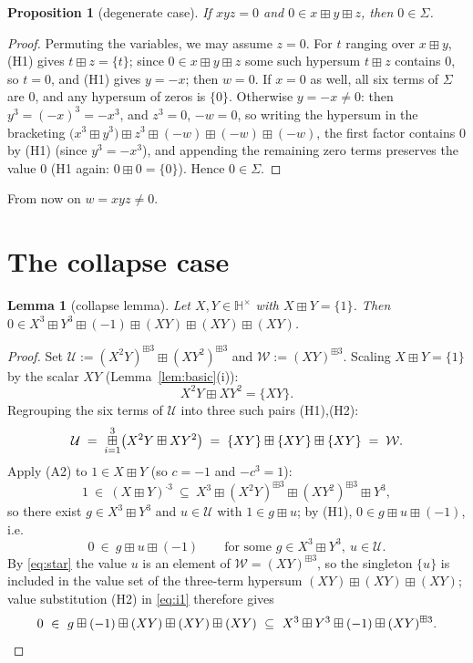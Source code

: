 \documentclass[11pt]{article}
\newtheorem{lemma}[theorem]{Lemma}
\newtheorem{proposition}[theorem]{Proposition}
\theoremstyle{definition}
\theoremstyle{remark}
\newcommand{\Hb}{\mathbb{H}}
\newcommand{\bp}{\boxplus}
\newcommand{\bigboxplus}{\mathop{\mbox{\normalsize$\boxplus$}}\limits}
\begin{document}
\begin{proposition}[degenerate case]\label{prop:degen}
If $xyz=0$ and $0\in x\bp y\bp z$, then $0\in\Sigma$.
\end{proposition}
\begin{proof}
Permuting the variables, we may assume $z=0$. For $t$ ranging over
$x\bp y$, (H1) gives $t\bp z=\{t\}$; since $0\in x\bp y\bp z$ some such
hypersum $t\bp z$ contains $0$, so $t=0$, and (H1) gives $y=-x$; then
$w=0$. If $x=0$ as well, all six terms of $\Sigma$ are $0$, and any
hypersum of zeros is $\{0\}$. Otherwise $y=-x\neq0$: then
$y^3=(-x)^3=-x^3$, and $z^3=0$, $-w=0$, so writing the hypersum in the
bracketing $\bigl(x^3\bp y^3\bigr)\bp z^3\bp(-w)\bp(-w)\bp(-w)$, the
first factor contains $0$ by (H1) (since $y^3=-x^3$), and appending the
remaining zero terms preserves the value $0$ (H1 again:
$0\bp0=\{0\}$). Hence $0\in\Sigma$.
\end{proof}

From now on $w=xyz\neq0$.

\section{The collapse case}\label{sec:collapse}

\begin{lemma}[collapse lemma]\label{lem:collapse}
Let $X,Y\in\Hb^\times$ with $X\bp Y=\{1\}$. Then
$0\in X^3\bp Y^3\bp(-1)\bp(XY)\bp(XY)\bp(XY)$.
\end{lemma}

\begin{proof}
Set $\mathcal U:=(X^2Y)^{\bp3}\bp(XY^2)^{\bp3}$ and
$\mathcal W:=(XY)^{\bp3}$. Scaling $X\bp Y=\{1\}$ by the scalar $XY$
(Lemma~\ref{lem:basic}(i)):
\[
  X^2Y\bp XY^2=\{XY\}.
\]
Regrouping the six terms of $\mathcal U$ into three such pairs (H1),(H2):
\begin{equation}\label{eq:star}
  \mathcal U
  \;=\;\bigboxplus_{i=1}^{3}\bigl(X^2Y\bp XY^2\bigr)
  \;=\;\{XY\}\bp\{XY\}\bp\{XY\}
  \;=\;\mathcal W .
\end{equation}
Apply (A2) to $1\in X\bp Y$ (so $c=-1$ and $-c^3=1$):
\[
  1\ \in\ (X\bp Y)^{\cdot3}\ \subseteq\
   X^3\bp(X^2Y)^{\bp3}\bp(XY^2)^{\bp3}\bp Y^3 ,
\]
so there exist $g\in X^3\bp Y^3$ and $u\in\mathcal U$ with $1\in g\bp u$;
by (H1), $0\in g\bp u\bp(-1)$, i.e.\
\begin{equation}\label{eq:i1}
  0\ \in\ g\bp u\bp(-1)\qquad
   \text{for some } g\in X^3\bp Y^3,\ u\in\mathcal U .
\end{equation}
By \eqref{eq:star} the value $u$ is an element of
$\mathcal W=(XY)^{\bp3}$, so the singleton $\{u\}$ is included in the
value set of the three-term hypersum $(XY)\bp(XY)\bp(XY)$; value
substitution (H2) in \eqref{eq:i1} therefore gives
\[
  0\ \in\ g\bp(-1)\bp(XY)\bp(XY)\bp(XY)
  \ \subseteq\ X^3\bp Y^3\bp(-1)\bp(XY)^{\bp3} . \qedhere
\]
\end{proof}
\end{document}
